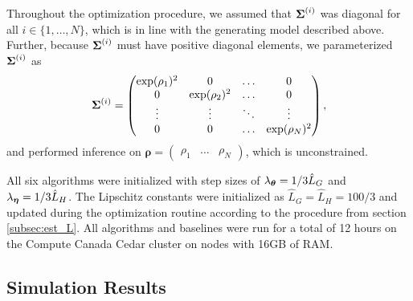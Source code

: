 Throughout the optimization procedure, we assumed that $\boldsymbol{\Sigma}^{(i)}$ was diagonal for all $i \in \{1,\ldots,N\}$, which is in line with the generating model described above. Further, because $\boldsymbol{\Sigma}^{(i)}$ must have positive diagonal elements, we parameterized $\boldsymbol{\Sigma}^{(i)}$ as 
%
\begin{equation}
    \boldsymbol{\Sigma}^{(i)} = 
    \begin{pmatrix}
        \exp(\rho_1)^2 & 0 & \ldots & 0 \\
        0 & \exp(\rho_2)^2 & \ldots & 0 \\
        \vdots & \vdots & \ddots & \vdots \\
        0 & 0 & \ldots & \exp(\rho_N)^2 \\
    \end{pmatrix},
\end{equation}
%
and performed inference on $\boldsymbol{\rho} = \begin{pmatrix} \rho_1 & \ldots & \rho_N \end{pmatrix}$, which is unconstrained.

All six algorithms were initialized with step sizes of $\lambda_{\boldsymbol{\theta}} = 1/3 \hat L_G$ and $\lambda_{\boldsymbol{\eta}} = 1/3 \hat L_H$. The Lipschitz constants were initialized as $\hat L_G = \hat L_H = 100/3$ and updated during the optimization routine according to the procedure from section \ref{subsec:est_L}. 
%
All algorithms and baselines were run for a total of 12 hours on the Compute Canada Cedar cluster on nodes with 16GB of RAM.

\subsection{Simulation Results}

